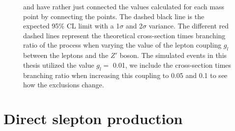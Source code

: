 \documentclass[12pt, a4paper]{book}
\begin{document}
\begin{figure}[!ht]
{   and have rather just connected the values calculated for each mass point by connecting the points. The dashed black line is the expected 95\% CL limit with a 1$\sigma$ and 2$\sigma$ variance. 
   The different red dashed lines represent the theoretical cross-section times branching ratio of the process when varying the value of the lepton coupling $g_l$ between the leptons and the $Z'$ boson. The simulated events in this thesis utilized the value $g_l=$ 0.01, we include the cross-section times branching ratio when increasing this coupling to 0.05 and 0.1 to see how the exclusions change.  }\label{fig:EFT_LDS_me_SRS}
\end{figure}


\clearpage
\section{Direct slepton production}
\end{document}
